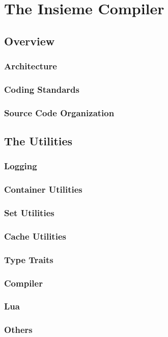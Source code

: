 \chapter{The Insieme Compiler} \label{cap:compiler}

\section{Overview}
\subsection{Architecture}
\subsection{Coding Standards}
\subsection{Source Code Organization}

\section{The Utilities}
\subsection{Logging}
\subsection{Container Utilities}
\subsection{Set Utilities}
\subsection{Cache Utilities}
\subsection{Type Traits}
\subsection{Compiler}
\subsection{Lua}
\subsection{Others}

